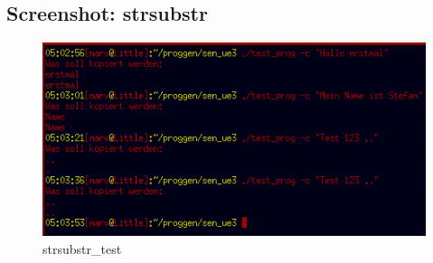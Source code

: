 \documentclass{scrartcl}
\begin{document}
\subsection{Screenshot: strsubstr}
\begin{figure}[H]
  \centering
  \includegraphics[width=0.9\linewidth]{images/strsubstr_test.png}
  \caption{strsubstr\_test}
  \label{fig:digraph}
\end{figure}
\end{document}
